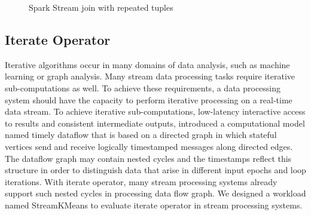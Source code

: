 \begin{figure}
  \begin{center}
   \caption{Spark Stream join with repeated tuples}
   \label{fig:spark_join_repeat}
  \end{center}
\end{figure}

\subsection{Iterate Operator}
\label{sub:iterate_operator}

Iterative algorithms occur in many domains of data analysis, such as machine learning or graph analysis. Many stream data processing tasks require iterative sub-computations as well. To achieve these requirements, a data processing system should have the capacity to perform iterative processing on a real-time data stream. To achieve iterative sub-computations,  low-latency interactive access to results and consistent intermediate outputs, \citeauthor{murray2013naiad} introduced a computational model named timely dataflow that is based on a directed graph in which stateful vertices send and receive logically timestamped messages along directed edges. \cite{murray2013naiad} The dataflow graph may contain nested cycles and the timestamps reflect this structure in order to distinguish data that arise in different input epochs and loop iterations. With iterate operator, many stream processing systems already support such nested cycles in processing data flow graph. We designed a workload named StreamKMeans to evaluate iterate operator in stream processing systems.

